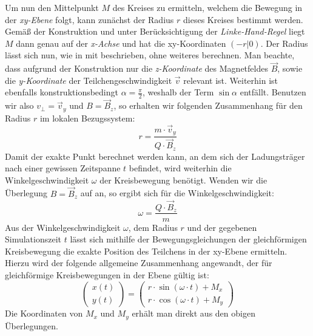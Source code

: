 Um nun den Mittelpunkt \(M\) des Kreises zu ermitteln, welchem die Bewegung in der \textit{xy-Ebene} folgt, kann zun\"achst der
Radius \(r\) dieses Kreises bestimmt werden. Gem\"a{\ss} der Konstruktion und unter Ber\"ucksichtigung der \textit{Linke-Hand-Regel}
liegt \(M\) dann genau auf der \textit{x-Achse} und hat die xy-Koordinaten \(\left(-r| 0 \right)\). Der Radius l\"asst sich nun,
wie in  mit  beschrieben, ohne weiteres berechnen. Man beachte, dass aufgrund der
Konstruktion nur die \textit{z-Koordinate} des Magnetfeldes \(\vec{B}\), sowie die \textit{y-Koordinate} der Teilchengeschwindigkeit
\(\vec{v}\) relevant ist. Weiterhin ist ebenfalls konstruktionsbedingt \(\alpha = \frac{\pi}{2}\), weshalb der Term \(\sin{\alpha}\)
entf\"allt. Benutzen wir also \(v_\perp = \vec{v}_y\) und \(B = \vec{B}_z\), so erhalten wir folgenden Zusammenhang f\"ur den Radius
\(r\) im lokalen Bezugssystem:
\begin{equation}
  r = \frac{m \cdot \vec{v}_y}{Q \cdot \vec{B}_z}
\end{equation}
Damit der exakte Punkt berechnet werden kann, an dem sich der Ladungstr\"ager nach einer gewissen Zeitspanne \(t\) befindet, wird
weiterhin die Winkelgeschwindigkeit \(\omega\) der Kreisbewegung ben\"otigt. Wenden wir die \"Uberlegung \(B = \vec{B}_z \) auf
 an, so ergibt sich f\"ur die Winkelgeschwindigkeit:
\begin{equation}
  \omega = \frac{Q \cdot \vec{B}_z}{m}
\end{equation}
Aus der Winkelgeschwindigkeit \(\omega\), dem Radius \(r\) und der gegebenen Simulationszeit \(t\) l\"asst sich mithilfe der
Bewegungsgleichungen der gleichf\"ormigen Kreisbewegung die exakte Position des Teilchens in der xy-Ebene ermitteln.
Hierzu wird der folgende allgemeine Zusammenhang angewandt, der f\"ur gleichf\"ormige Kreisbewegungen in der Ebene g\"ultig ist:
\begin{equation*}
  \begin{pmatrix}
    x(t) \\
    y(t)
  \end{pmatrix}
  =
  \begin{pmatrix}
    r \cdot \sin{\left(\omega \cdot t\right)} + M_x \\
    r \cdot \cos{\left(\omega \cdot t\right)} + M_y
  \end{pmatrix}
\end{equation*}
Die Koordinaten von \(M_x\) und \(M_y\) erh\"alt man direkt aus den obigen \"Uberlegungen.

